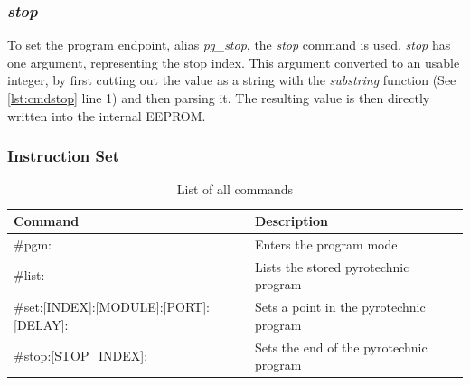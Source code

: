 

\pagebreak

\subsubsection{\textit{stop}}
To set the program endpoint, alias \textit{pg\_stop}, the \textit{stop} command is used. \textit{stop} has one argument, representing the stop index. This argument converted to an usable integer, by first cutting out the value as a string with the \textit{substring} function (See \cref{lst:cmdstop} line 1) and then parsing it. The resulting value is then directly written into the internal EEPROM.\\




\subsubsection{Instruction Set}
\label{Instruction Set}

\begin{table}[ht!]
\centering
\begin{tabular}{|l|l|} 
\hline
Command                                & Description                                              \\ 
\hline \hline
\#pgm:                                 & Enters the program mode \\ 
\hline
\#list:                                & Lists the stored pyrotechnic program\\ 
\hline
\#set:[INDEX]:[MODULE]:[PORT]:[DELAY]: & Sets a point in the pyrotechnic program\\ 
\hline
\#stop:[STOP\_INDEX]:                  & Sets the end of the pyrotechnic program\\
\hline
\end{tabular}
\caption{List of all commands}
\label{tab:instruction_set}
\end{table}

\pagebreak